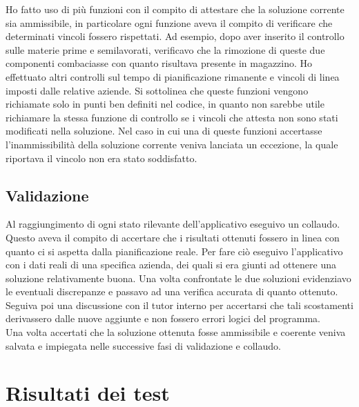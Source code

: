 Ho fatto uso di più funzioni con il compito di attestare che la soluzione corrente sia ammissibile, in particolare ogni funzione aveva il compito di verificare che
determinati vincoli fossero rispettati. Ad esempio, dopo aver inserito il controllo sulle materie prime e semilavorati, verificavo che la rimozione di queste due componenti
combaciasse con quanto risultava presente in magazzino. Ho effettuato altri controlli sul tempo di pianificazione rimanente e vincoli di linea imposti dalle relative
aziende. Si sottolinea che queste funzioni vengono richiamate solo in punti ben definiti nel codice, in quanto non sarebbe utile richiamare la stessa funzione di controllo
se i vincoli che attesta non sono stati modificati nella soluzione. Nel caso in cui una di queste funzioni accertasse l'inammissibilità della soluzione corrente veniva 
lanciata un eccezione, la quale riportava il vincolo non era stato soddisfatto.


\subsection{Validazione}

Al raggiungimento di ogni stato rilevante dell'applicativo eseguivo un collaudo. Questo aveva il compito di accertare che i risultati ottenuti fossero in linea con
quanto ci si aspetta dalla pianificazione reale. Per fare ciò eseguivo l'applicativo con i dati reali di una specifica azienda, dei quali si era giunti ad ottenere
una soluzione relativamente buona. Una volta confrontate le due soluzioni evidenziavo le eventuali discrepanze e passavo ad una verifica accurata di quanto ottenuto.
Seguiva poi una discussione con il tutor interno per accertarsi che tali scostamenti derivassero dalle nuove aggiunte e non fossero errori logici del programma.\\ Una volta 
accertati che la soluzione ottenuta fosse ammissibile e coerente veniva salvata e impiegata nelle successive fasi di validazione e collaudo.

\section{Risultati dei test}

